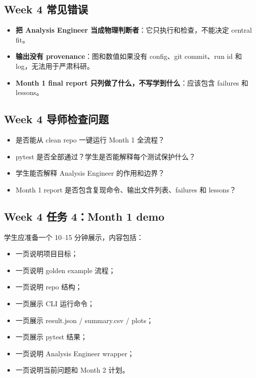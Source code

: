 \documentclass[11pt,a4paper,fontset=fandol]{ctexart}
\begin{document}
\subsection{Week 4 常见错误}
\begin{itemize}[leftmargin=2em]
  \item \textbf{把 Analysis Engineer 当成物理判断者}：它只执行和检查，不能决定 central fit。
  \item \textbf{输出没有 provenance}：图和数值如果没有 config、git commit、run id 和 log，无法用于严肃科研。
  \item \textbf{Month 1 final report 只列做了什么，不写学到什么}：应该包含 failures 和 lessons。
\end{itemize}

\subsection{Week 4 导师检查问题}
\begin{itemize}[leftmargin=2em]
  \item 是否能从 clean repo 一键运行 Month 1 全流程？
  \item pytest 是否全部通过？学生是否能解释每个测试保护什么？
  \item 学生能否解释 Analysis Engineer 的作用和边界？
  \item Month 1 report 是否包含复现命令、输出文件列表、failures 和 lessons？
\end{itemize}

\subsection{Week 4 任务 4：Month 1 demo}

学生应准备一个 10--15 分钟展示，内容包括：

\begin{itemize}[leftmargin=2em]
  \item 一页说明项目目标；
  \item 一页说明 golden example 流程；
  \item 一页说明 repo 结构；
  \item 一页展示 CLI 运行命令；
  \item 一页展示 result.json / summary.csv / plots；
  \item 一页展示 pytest 结果；
  \item 一页说明 Analysis Engineer wrapper；
  \item 一页说明当前问题和 Month 2 计划。
\end{itemize}
\end{document}
